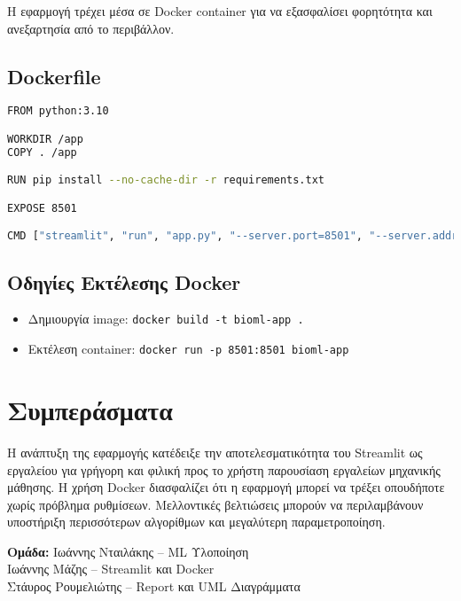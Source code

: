 \documentclass[a4paper,12pt]{article}
\begin{document}
Η εφαρμογή τρέχει μέσα σε Docker container για να εξασφαλίσει φορητότητα και ανεξαρτησία από το περιβάλλον.  

\subsection{Dockerfile}

\begin{lstlisting}[language=bash]
FROM python:3.10

WORKDIR /app
COPY . /app

RUN pip install --no-cache-dir -r requirements.txt

EXPOSE 8501

CMD ["streamlit", "run", "app.py", "--server.port=8501", "--server.address=0.0.0.0"]
\end{lstlisting}

\subsection{Οδηγίες Εκτέλεσης Docker}

\begin{itemize}
  \item Δημιουργία image: \texttt{docker build -t bioml-app .}
  \item Εκτέλεση container: \texttt{docker run -p 8501:8501 bioml-app}
\end{itemize}

\section{Συμπεράσματα}

Η ανάπτυξη της εφαρμογής κατέδειξε την αποτελεσματικότητα του Streamlit ως εργαλείου για γρήγορη και φιλική προς το χρήστη παρουσίαση εργαλείων μηχανικής μάθησης. Η χρήση Docker διασφαλίζει ότι η εφαρμογή μπορεί να τρέξει οπουδήποτε χωρίς πρόβλημα ρυθμίσεων. Μελλοντικές βελτιώσεις μπορούν να περιλαμβάνουν υποστήριξη περισσότερων αλγορίθμων και μεγαλύτερη παραμετροποίηση.

\vspace{1cm}

\noindent
\textbf{Ομάδα:}  
Ιωάννης Νταιλάκης – ML Υλοποίηση  \\
Ιωάννης Μάζης – Streamlit και Docker  \\ 
Στάυρος Ρουμελιώτης – Report και UML Διαγράμματα
\end{document}
